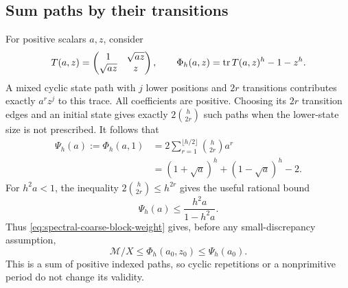\subsection{Sum paths by their transitions}

For positive scalars $a,z$, consider
$$
 T(a,z)=\begin{pmatrix}1&\sqrt{az}\\\sqrt{az}&z\end{pmatrix},
 \qquad \Phi_h(a,z)=\operatorname{tr} T(a,z)^h-1-z^h.
$$
A mixed cyclic state path with $j$ lower positions and $2r$ transitions
contributes exactly $a^rz^j$ to this trace. All coefficients are positive.
Choosing its $2r$ transition edges and an initial state gives exactly
$2\binom h{2r}$ such paths when the lower-state size is not prescribed.
It follows that
\begin{equation}\label{eq:spectral-partition-function}
 \begin{aligned}
 \Psi_h(a):=\Phi_h(a,1)
 &=2\sum_{r=1}^{\lfloor h/2\rfloor}\binom h{2r}a^r\\
 &=(1+\sqrt a)^h+(1-\sqrt a)^h-2.
 \end{aligned}
\end{equation}
For $h^2a<1$, the inequality $2\binom h{2r}\leqslant h^{2r}$
gives the useful rational bound
\begin{equation}\label{eq:spectral-partition-bound}
 \Psi_h(a)\leqslant\frac{h^2a}{1-h^2a}.
\end{equation}
Thus \eqref{eq:spectral-coarse-block-weight} gives, before any
small-discrepancy assumption,
\begin{equation}\label{eq:spectral-first-path-bound}
 \mathcal M/X\leqslant\Phi_h(a_0,z_0)\leqslant\Psi_h(a_0).
\end{equation}
This is a sum of positive indexed paths, so cyclic repetitions or a
nonprimitive period do not change its validity.

